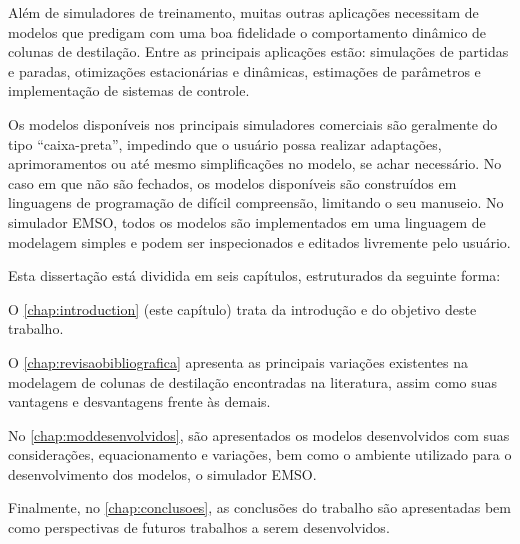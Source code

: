 Além de simuladores de treinamento, muitas outras aplicações necessitam de modelos que predigam com uma boa fidelidade
o comportamento dinâmico de colunas de destilação. Entre as principais aplicações estão: simulações de partidas e
paradas, otimizações estacionárias e dinâmicas, estimações de parâmetros e implementação de sistemas de controle.

Os modelos disponíveis nos principais simuladores comerciais são geralmente do tipo ``caixa-preta'', impedindo que
o usuário possa realizar adaptações, aprimoramentos ou até mesmo simplificações no modelo, se achar necessário. No
caso em que não são fechados, os modelos disponíveis são construídos em linguagens de programação
de difícil compreensão, limitando o seu manuseio.
No simulador EMSO, todos os modelos são implementados em uma linguagem de
modelagem simples e podem ser inspecionados e editados livremente pelo usuário.


Esta dissertação está dividida em seis capítulos, estruturados da seguinte forma:

O \autoref{chap:introduction} (este capítulo) trata da introdução e do objetivo deste trabalho.

O \autoref{chap:revisaobibliografica} apresenta as principais variações existentes na modelagem de colunas de destilação
encontradas na literatura, assim como suas vantagens e desvantagens frente às demais.

No \autoref{chap:moddesenvolvidos}, são apresentados os modelos desenvolvidos com suas considerações,
equacionamento e variações, bem como o ambiente utilizado para o desenvolvimento dos modelos,
o simulador EMSO.

Finalmente, no \autoref{chap:conclusoes}, as conclusões do trabalho são apresentadas bem como perspectivas de
futuros trabalhos a serem desenvolvidos.